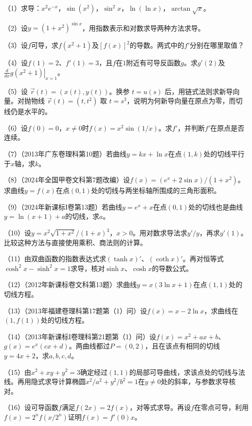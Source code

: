 \newpage
\begin{exercise}[本节习题]
\mbox{}\par\nobreak

（1）求导：\(x^2e^{-x}\)，\(\sin(x^2)\)，\(\sin^2x\)，\(\ln(\ln x)\)，\(\arctan\sqrt x\)。

（2）设\(y=(1+x^2)^{\sin x}\)，用指数表示和对数求导两种方法求导。

（3）设\(f\)可导，求\(f(x^2+1)\)及\([f(x)]^2\)的导数。两式中的\(f'\)分别在哪里取值？

（4）设\(f(1)=2\)、\(f'(1)=3\)，且\(f\)在\(1\)附近有可导反函数\(g\)。求\(g'(2)\)及\(\left.\frac d{dx}g(x^2+1)\right|_{x=1}\)。

（5）设 \(\vec r(t)=(x(t),y(t))\)。换参 \(t=u(s)\) 后，用链式法则求新导向量。对抛物线 \(\vec r(t)=(t,t^2)\) 取 \(t=s^3\)，说明为何新导向量在原点为零，而切线仍是水平的。

（6）设\(f(0)=0\)，\(x\ne0\)时\(f(x)=x^2\sin(1/x)\)。求\(f'\)，并判断\(f'\)在原点是否连续。

（7）（2013年广东卷理科第10题）若曲线\(y=kx+\ln x\)在点\((1,k)\)处的切线平行于\(x\)轴，求\(k\)。

（8）（2024年全国甲卷文科第7题改编）设\(f(x)=(e^x+2\sin x)/(1+x^2)\)。求曲线\(y=f(x)\)在点\((0,1)\)处的切线与两坐标轴所围成的三角形面积。

（9）（2024年新课标I卷第13题）若曲线\(y=e^x+x\)在点\((0,1)\)处的切线也是曲线\(y=\ln(x+1)+a\)的切线，求\(a\)。

（10）设\(y=x^2\sqrt{1+x^2}/(1+x)^3\)，\(x>0\)。用对数求导法求\(y'/y\)，再求\(y'(1)\)。比较这种方法与直接使用乘积、商法则的计算。

（11）由双曲函数的指数表达式求\((\tanh x)'\)、\((\coth x)'\)。再对恒等式\(\cosh^2x-\sinh^2x=1\)求导，核对\(\sinh x\)、\(\cosh x\)的导数公式。

（12）（2012年新课标卷文科第13题）求曲线\(y=x(3\ln x+1)\)在点\((1,1)\)处的切线方程。

（13）（2013年福建卷理科第17题第（1）问）设\(f(x)=x-2\ln x\)，求曲线在\((1,f(1))\)处的切线方程。

（14）（2013年新课标I卷理科第21题第（1）问）设\(f(x)=x^2+ax+b\)、\(g(x)=e^x(cx+d)\)。两曲线都过\(P=(0,2)\)，且在该点有相同的切线\(y=4x+2\)，求\(a,b,c,d\)。

（15）由\(x^2+xy+y^2=3\)确定经过\((1,1)\)的局部可导曲线，求该点处的切线与法线。再用隐式求导计算椭圆\(x^2/a^2+y^2/b^2=1\)在\(y\ne0\)处的斜率，与参数求导核对。

（16）设可导函数\(f\)满足\(f(2x)=2f(x)\)，对等式求导。再设\(f\)在零点可导，利用\(f(x)=2^nf(x/2^n)\)证明\(f(x)=f'(0)x\)。
\end{exercise}
\endgroup

